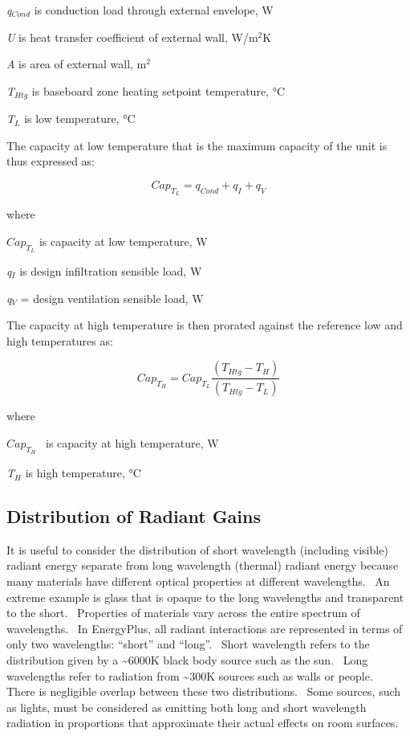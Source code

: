 \emph{q\(_{Cond}\)} is conduction load through external envelope, W

\emph{U} is heat transfer coefficient of external wall, W/m\(^{2}\)K

\emph{A} is area of external wall, m\(^{2}\)

\emph{T\(_{Htg}\)} is baseboard zone heating setpoint temperature, °C

\emph{T\(_{L}\)} is low temperature, °C

The capacity at low temperature that is the maximum capacity of the unit is thus expressed as:

\begin{equation}
Ca{p_{{T_L}}} = {q_{Cond}} + {q_I} + {q_V}
\end{equation}

where

\(Ca{p_{{T_L}}}\) is capacity at low temperature, W

\emph{q\(_{I}\)} is design infiltration sensible load, W

\emph{q\(_{V}\)} = design ventilation sensible load, W

The capacity at high temperature is then prorated against the reference low and high temperatures as:

\begin{equation}
Ca{p_{{T_H}}} = Ca{p_{{T_L}}}\frac{{\left( {{T_{Htg}} - {T_H}} \right)}}{{\left( {{T_{Htg}} - {T_L}} \right)}}
\end{equation}

where

\(Ca{p_{{T_H}}}\) ~is capacity at high temperature, W

\emph{T\(_{H}\)} is high temperature, °C

\subsection{Distribution of Radiant Gains}\label{distribution-of-radiant-gains}

It is useful to consider the distribution of short wavelength (including visible) radiant energy separate from long wavelength (thermal) radiant energy because many materials have different optical properties at different wavelengths.~ An extreme example is glass that is opaque to the long wavelengths and transparent to the short.~ Properties of materials vary across the entire spectrum of wavelengths.~ In EnergyPlus, all radiant interactions are represented in terms of only two wavelengths: ``short'' and ``long''.~ Short wavelength refers to the distribution given by a \textasciitilde{}6000K black body source such as the sun.~ Long wavelengths refer to radiation from \textasciitilde{}300K sources such as walls or people.~ There is negligible overlap between these two distributions.~ Some sources, such as lights, must be considered as emitting both long and short wavelength radiation in proportions that approximate their actual effects on room surfaces.

